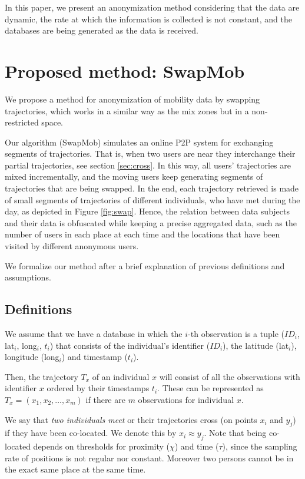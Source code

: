 \documentclass{llncs}
\begin{document}
In this paper, we present an anonymization method considering that the data are dynamic, the rate at which the information is collected is not constant, and the databases are being generated as the data is received.


\section{Proposed method: SwapMob}

We propose a method for anonymization of mobility data by swapping trajectories, which works in a similar way as the mix zones but in a non-restricted space.


Our algorithm (SwapMob) simulates an online P2P system for exchanging segments of trajectories. That is, when two users are near they interchange their partial trajectories, see section \ref{sec:cross}.
In this way, all users' trajectories are mixed incrementally, and the moving users keep generating segments of trajectories that are being swapped. In the end, each trajectory retrieved is made of small segments of trajectories of different individuals, who have met during the day, as depicted in Figure \ref{fig:swap}. Hence, the relation between data subjects and their data is obfuscated while keeping a precise aggregated data, such as the number of users in each place at each time and the locations that have been visited by different anonymous users.

We formalize our method after a brief explanation of previous definitions and assumptions.

\subsection{Definitions}
We assume that we have a database in which the $i$-th observation is a tuple ($ID_i$, lat$_i$, long$_i$, $t_i$) that
consists of the individual's identifier ($ID_i$), the latitude (lat$_i$), longitude (long$_i$) and timestamp ($t_i$).

Then, the trajectory $T_x$ of an individual \texttt{$x$} will consist of all the observations with identifier \texttt{$x$} ordered by their timestamps \texttt{$t_i$}.
These can be represented as $T_x = (x_1, x_2, \ldots, x_m)$ if there are $m$ observations for individual $x$.


We say that \emph{two individuals meet} or their trajectories cross (on points $x_i$ and $y_j$) if they have been co-located. We denote this by $x_i \approx y_j$. Note that being co-located depends on thresholds for proximity ($\chi$) and time ($\tau$), since the sampling rate of positions is not regular nor constant. Moreover two persons cannot be in the exact same place at the same time.
\end{document}
